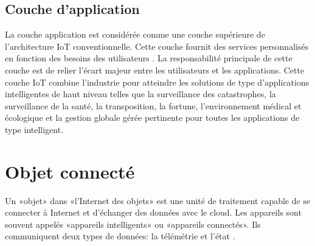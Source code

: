 \subsection{Couche d'application}
La couche application est considérée comme une couche supérieure de l'architecture IoT conventionnelle. Cette couche fournit des services personnalisés en fonction des besoins des utilisateurs \cite{13}. La responsabilité principale de cette couche est de relier l'écart majeur entre les utilisateurs et les applications. Cette couche IoT combine l'industrie pour atteindre les solutions de type d'applications intelligentes de haut niveau telles que la surveillance des catastrophes, la surveillance de la santé, la transposition, la fortune, l'environnement médical et écologique et la gestion globale gérée pertinente pour toutes les applications de type intelligent.
\section{Objet connecté}
Un «objet» dans «l'Internet des objets» est une unité de traitement capable de se connecter à Internet et d'échanger des données avec le cloud. Les appareils sont souvent appelés «appareils intelligents» ou «appareils connectés». Ils communiquent deux types de données: la télémétrie et l'état \cite{zouganeli2009connected}.
